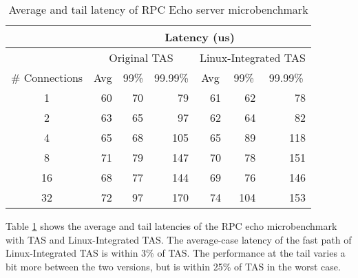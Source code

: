 \begin{table}
\begin{tabular}{@{}crrrrrr@{}}
\toprule
               & \multicolumn{6}{c}{Latency (us)}                                                                                                                                    \\ \midrule
               & \multicolumn{3}{c}{Original TAS}                                                          & \multicolumn{3}{c}{Linux-Integrated TAS}                                         \\
\# Connections & \multicolumn{1}{c}{Avg} & \multicolumn{1}{c}{99\%} & \multicolumn{1}{c}{99.99\%} & \multicolumn{1}{c}{Avg} & \multicolumn{1}{c}{99\%} & \multicolumn{1}{c}{99.99\%} \\
1              & 60                      & 70                       & 79                          & 61                      & 62                       & 78                          \\
2              & 63                      & 65                       & 97                          & 62                      & 64                       & 82                          \\
4              & 65                      & 68                       & 105                         & 65                      & 89                       & 118                         \\
8              & 71                      & 79                       & 147                         & 70                      & 78                       & 151                         \\
16             & 68                      & 77                       & 144                         & 69                      & 76                       & 146                         \\
32             & 72                      & 97                       & 170                         & 74                      & 104                      & 153                         \\ \bottomrule
\end{tabular}
\vspace{16pt}
\caption{Average and tail latency of RPC Echo server microbenchmark}
\label{tab:fastpath-latency}

\end{table}

Table \ref{tab:fastpath-latency} shows the average and tail latencies of the RPC 
echo microbenchmark with TAS and Linux-Integrated TAS. The average-case latency
of the fast path of Linux-Integrated TAS is within 3\% of TAS. The performance 
at the tail varies a bit more between the two versions, but is within 25\% of 
TAS in the worst case.


